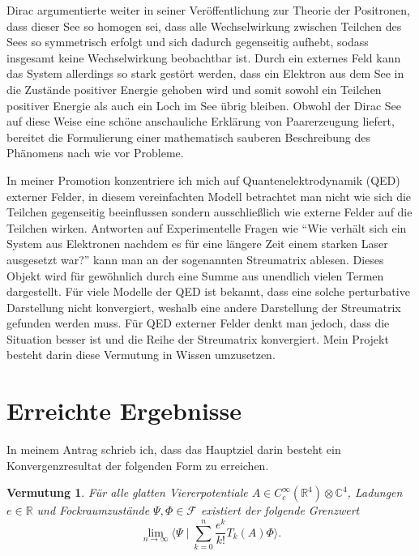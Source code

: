 \documentclass[a4paper,12pt]{article}
\newtheorem{vermutung}{Vermutung}
\begin{document}
Dirac argumentierte weiter in seiner Veröffentlichung zur Theorie der Positronen, 
dass dieser See so homogen sei, dass alle Wechselwirkung zwischen 
Teilchen des Sees so symmetrisch erfolgt und sich dadurch gegenseitig aufhebt, sodass insgesamt keine Wechselwirkung 
beobachtbar ist. Durch ein externes Feld kann das System allerdings so stark gestört werden, dass ein Elektron aus dem
See in die Zustände positiver Energie gehoben wird und somit sowohl ein Teilchen positiver Energie als auch ein Loch
im See übrig bleiben. Obwohl der Dirac See auf diese Weise eine schöne anschauliche Erklärung von Paarerzeugung liefert,
bereitet die Formulierung einer mathematisch sauberen Beschreibung des Phänomens nach wie vor Probleme. 

In meiner Promotion konzentriere ich mich auf Quantenelektrodynamik (QED) externer Felder, in diesem vereinfachten Modell 
betrachtet man nicht wie sich die Teilchen gegenseitig beeinflussen sondern ausschließlich wie externe Felder auf die Teilchen
wirken. Antworten auf Experimentelle Fragen wie ``Wie verhält sich ein System aus Elektronen nachdem es für eine längere 
Zeit einem starken Laser ausgesetzt war?'' kann man an der sogenannten Streumatrix ablesen. Dieses Objekt wird für 
gewöhnlich durch eine Summe aus unendlich vielen Termen dargestellt. Für viele Modelle der QED ist bekannt,
dass eine solche perturbative Darstellung nicht konvergiert, weshalb eine andere Darstellung der Streumatrix gefunden
werden muss. Für QED externer Felder denkt man jedoch, dass die Situation besser ist und 
die Reihe der Streumatrix konvergiert. Mein Projekt besteht darin diese Vermutung in Wissen umzusetzen.

\section{Erreichte Ergebnisse}

In meinem Antrag schrieb ich, dass das Hauptziel darin besteht ein Konvergenzresultat der folgenden Form zu erreichen. 

\begin{vermutung}
Für alle glatten Viererpotentiale \(A\in C_c^\infty(\mathbb{R}^4)\otimes \mathbb{C}^4\), Ladungen \(e\in\mathbb{R}\)
und Fockraumzustände \(\Psi,\Phi\in \mathcal{F}\) existiert der folgende Grenzwert
\begin{equation}\label{Ziel}
\lim_{n\rightarrow \infty} \langle \Psi\mid \sum_{k=0}^n \frac{e^k}{k!} T_k(A) \Phi \rangle.
\end{equation}
\end{vermutung}
\end{document}
